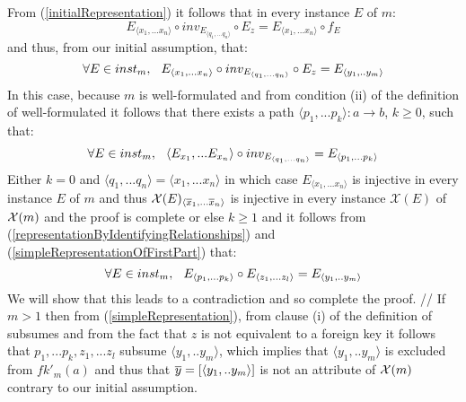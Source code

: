 \documentclass[10pt,a4paper]{article}
\newcommand{\genericmodel}{\mathcal{M}}
\renewcommand{\genericmodel}{{m}}
\newcommand{\fkp}[2] [\genericmodel]{fk'_{#1}(#2)}
\newcommand{\logtophys}{\mathcal{X}}
\begin{document}
\noindent From (\ref{initialRepresentation}) it follows that in every instance $E$ of $\genericmodel$:  
\begin{equation*}
E_{\langle x_1,...x_n \rangle}\circ inv_{E_{\langle q_1,...q_n \rangle}} \circ E_{z}  = E_{\langle x_1,...x_n \rangle} \circ f_E 
\end{equation*}
\noindent and thus, from our initial assumption, that:
\begin{equation}
\label{representationByIdentifyingRelationships}
\ineveryinstance E_{\langle x_1,...x_n \rangle}\circ inv_{E_{\langle q_1,...q_n \rangle}} \circ E_{z} = E_{\langle y_1,..y_m \rangle} 
\end{equation}
\noindent In this case, because $\genericmodel$ is well-formulated and from condition (ii) of the definition of well-formulated it follows that there exists
a path $\langle p_1,...p_k \rangle:a \rightarrow b$, $k \geq 0$, such that:
\begin{equation}
\label{simpleRepresentationOfFirstPart}
\ineveryinstance \langle E_{x_1},...E_{x_n} \rangle \circ inv_{E_{\langle q_1,...q_n \rangle}} = E_{\langle p_1,...p_k \rangle}
\end{equation}
\noindent Either $k=0$ and $\langle q_1,...q_n \rangle = \langle x_1,...x_n \rangle$ in which case $E_{\langle x_1,...x_n \rangle}$ is
injective in every instance $E$ of $\genericmodel$ and thus $\logtophys(E)_{\langle \phys{x}_1,...\phys{x}_n \rangle}$ is
injective in every instance $\logtophys(E)$ of $\genericphysical$ and the proof is complete 
\noindent or else $k \geq 1$ and it follows from (\ref{representationByIdentifyingRelationships}) and (\ref{simpleRepresentationOfFirstPart}) that:
\begin{equation} 
\label{simpleRepresentation}
\ineveryinstance  E_{\langle p_1,...p_k \rangle} \circ E_{\langle z_1,...z_l \rangle} = E_{\langle y_1,..y_m \rangle} 
\end{equation}
\noindent We will show that this leads to a contradiction and so complete the proof. //
If $m >1$ then
 from  (\ref{simpleRepresentation}),
from clause (i) of the definition of subsumes and from the fact that $z$ is not equivalent to a foreign key 
it follows that $p_1,...p_k,z_1,...z_l$ subsume $\langle y_1,..y_m \rangle$, 
which implies that $\langle y_1,..y_m \rangle$ is excluded from $\fkp{a}$ and thus that 
 $\overline{y}=\left[\langle y_1,..y_m \rangle\right]$ is not an attribute of $\genericphysical$ contrary to our 
initial assumption. 
\end{document}

